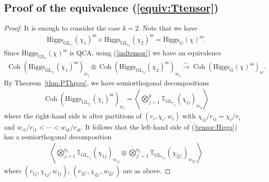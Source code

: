 \documentclass [11pt,oneside,a4paper,mathscr]{amsart}
\theoremstyle{definition}
\newcommand{\Coh}{\operatorname{Coh}}
\newcommand{\GL}{\operatorname{GL}}
\newcommand{\Hig}{\mathrm{Higgs}}
\begin{document}
\subsection{Proof of the equivalence (\ref{equiv:Ttensor})}\label{subsec:Ttensor}
\begin{proof}
It is enough to consider the case $k=2$. 
Note that we have 
\begin{align*}
    \Hig_{\GL_{r_1}}(\chi_1)^{\mathrm{ss}}\times \Hig_{\GL_{r_2}}(\chi_2)^{\mathrm{ss}}
    =\Hig_{G}(\chi)^{\mathrm{ss}}.
\end{align*}
Since 
$\Hig_{\GL_r}(\chi)^{\mathrm{ss}}$ is QCA, using (\ref{indtensor}) we have an equivalence
\begin{align}\label{tensor:Higgs}
\Coh(\Hig_{\GL_{r_1}}(\chi_1)^{\mathrm{ss}})_{w_1}\otimes 
\Coh(\Hig_{\GL_{r_2}}(\chi_2)^{\mathrm{ss}})_{w_2} \stackrel{\sim}{\to}
\Coh(\Hig_{G}(\chi)^{\mathrm{ss}})_w.
\end{align}
By Theorem~\ref{thm:PThiggs},
we have semiorthogonal decompositions 
\begin{align*}
    \Coh(\Hig_{\GL_{r_i}}(\chi_i)^{\mathrm{ss}})_{w_i}
    =\left\langle \bigotimes_{j=1}^{k}\mathbb{T}_{\GL_{r_{ij}}}(\chi_{ij})_{w_{ij}} \right\rangle
\end{align*}
where the right-hand side is after partitions of $(r_i, \chi_i, w_i)$
with $\chi_{ij}/r_{ij}=\chi_i/r_i$ and $w_{i1}/r_{i1}<\cdots<w_{ik}/r_{ik}$.
It follows that the left-hand side of (\ref{tensor:Higgs})
has a semiorthogonal decomposition 
\begin{align}\label{sod:left}
\left\langle 
\bigotimes_{j=1}^{k_1}\mathbb{T}_{\GL_{r_{1j}}}(\chi_{1j})_{w_{1j}} \otimes
\bigotimes_{j'=1}^{k_2}\mathbb{T}_{\GL_{r_{2j'}}}(\chi_{2j'})_{w_{2j'}}
\right\rangle
\end{align}
where $(r_{1j}, \chi_{1j}, w_{1j})$, $(r_{2j'}, \chi_{2j'}, w_{2j'})$ are as above. 


\end{proof}
\end{document}
